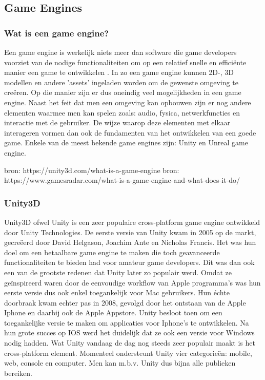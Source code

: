 \subsection{Game Engines}
\subsubsection{Wat is een game engine?}
Een game engine is werkelijk niets meer dan software die game developers voorziet van de nodige functionaliteiten om op een relatief snelle en efficiënte manier een game te ontwikkelen \autocite{Oculus2018}. In zo een game engine kunnen 2D-, 3D modellen en andere 'assets' ingeladen worden om de gewenste omgeving te creëren. Op die manier zijn er dus oneindig veel mogelijkheden in een game engine. Naast het feit dat men een omgeving kan opbouwen zijn er nog andere elementen waarmee men kan spelen zoals: audio, fysica, netwerkfuncties en interactie met de gebruiker. De wijze  waarop deze elementen met elkaar interageren vormen dan ook de fundamenten van het ontwikkelen van een goede game. Enkele van de meest bekende game engines zijn: Unity en Unreal game engine. \autocite{Staff2018}
 

bron: https://unity3d.com/what-is-a-game-engine
bron: https://www.gamesradar.com/what-is-a-game-engine-and-what-does-it-do/

\subsubsection{Unity3D}

Unity3D ofwel Unity is een zeer populaire cross-platform game engine ontwikkeld door Unity Technologies.
De eerste versie van Unity kwam in 2005 op de markt, gecreëerd door David Helgason, Joachim Ante en Nicholas Francis. Het was hun doel om een betaalbare game engine te maken die toch geavanceerde functionaliteiten te bieden had voor amateur game developers. Dit was dan ook een van de grootste redenen dat Unity later zo populair werd. Omdat ze geïnspireerd waren door de eenvoudige workflow van Apple programma's was hun eerste versie dus ook enkel toegankelijk voor Mac gebruikers. Hun échte doorbraak kwam echter pas in 2008, gevolgd door het ontstaan van de Apple Iphone en daarbij ook de Apple Appstore. Unity besloot toen om een toegankelijke versie te maken om applicaties voor Iphone's te ontwikkelen. Na hun grote succes op IOS werd het duidelijk dat ze ook een versie voor Windows nodig hadden. Wat Unity vandaag de dag nog steeds zeer populair maakt is het cross-platform element. Momenteel ondersteunt Unity vier categorieën: mobile, web, console en computer. Men kan m.b.v. Unity dus bijna alle publieken bereiken.

